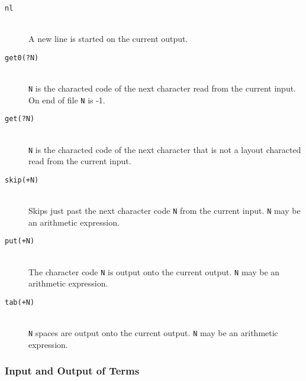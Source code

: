\begin{description}

\item [{\tt nl}]~\\ 
	A new line is started on the current output.

\item [{\tt get0(?N)}]~\\ 
	{\tt N} is the characted code of the next character read from
	the current input. On end of file {\tt N} is -1.

\item [{\tt get(?N)}]~\\ 
	{\tt N} is the characted code of the next character that is
	not a layout characted read from the current input. 

\item [{\tt skip(+N)}]~\\ 
	Skips just past the next character code {\tt N} from the
	current input. {\tt N} may be an arithmetic expression.

\item [{\tt put(+N)}]~\\ 
	The character code {\tt N} is output onto the current output. 
	{\tt N} may be an arithmetic expression.

\item [{\tt tab(+N)}]~\\ 
	{\tt N} spaces are output onto the current output.
	{\tt N} may be an arithmetic expression.

\end{description}



\subsubsection{Input and Output of Terms}


